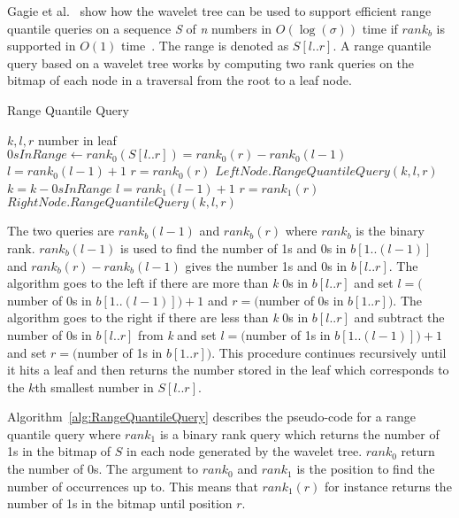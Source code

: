 Gagie et al.~ show how the wavelet tree can be used to support efficient range quantile queries on a sequence \textit{S} of \textit{n} numbers in $O(\log(\sigma))$ time if $rank_b$ is supported in $O(1)$ time~. 
The range is denoted as $S[l .. r]$.
A range quantile query based on a wavelet tree works by computing two rank queries on the bitmap of each node in a traversal from the root to a leaf node. 

\begin{algorithm}
\caption{Range Quantile Query}
\label{alg:RangeQuantileQuery}
\begin{algorithmic}
 {$k,l,r$}
	\State \Return number in leaf
\EndIf
\State $\textit{0}sInRange \gets rank_0(S [ l..r ]) = rank_0(r) - rank_0(l-1)$
	\State $l = rank_0(l-1)+1$
	\State $r = rank_0(r)$
	\State \Return $LeftNode.RangeQuantileQuery(k,l,r)$
\Else
	\State $k = k - \textit{0}sInRange$
	\State $l = rank_1(l-1)+1$
	\State $r = rank_1(r)$
	\State \Return $RightNode.RangeQuantileQuery(k,l,r)$
\EndIf

\EndFunction
\end{algorithmic}
\end{algorithm}

The two queries are $rank_b(l-1)$ and $rank_b(r)$ where $rank_b$ is the binary rank.
$rank_b(l-1)$ is used to find the number of 1s and 0s in $b[1..(l-1)]$ and $rank_b(r) - rank_b(l-1)$ gives the number 1s and 0s in $b[l..r]$. 
The algorithm goes to the left if there are more than \textit{k} 0s in $b[l..r]$ and set $l = ($number of 0s in $b[1..(l-1)])+1$ and $r=($number of 0s in $b[1..r])$. 
The algorithm goes to the right if there are less than \textit{k} 0s in $b[l..r]$ and subtract the number of 0s in $b[l..r]$ from \textit{k} and set $l = ($number of 1s in $b[1..(l-1)])+1$ and set $r=($number of 1s in $b[1..r])$. 
This procedure continues recursively until it hits a leaf and then returns the number stored in the leaf which corresponds to the $k$th smallest number in $S[l..r]$.

Algorithm~\ref{alg:RangeQuantileQuery} describes the pseudo-code for a range quantile query where $rank_1$ is a binary rank query which returns the number of 1s in the bitmap of $S$ in each node generated by the wavelet tree. 
$rank_0$ return the number of 0s.
The argument to $rank_0$ and $rank_1$ is the position to find the number of occurrences up to.
This means that $rank_1(r)$ for instance returns the number of 1s in the bitmap until position $r$.

